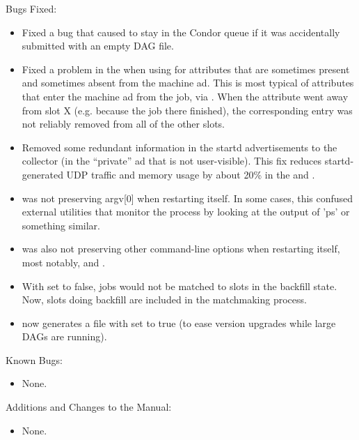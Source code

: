 \noindent Bugs Fixed:

\begin{itemize}

\item Fixed a bug that caused  to stay in the Condor
queue if it was accidentally submitted with an empty DAG file.

\item Fixed a problem in the  when using
 for attributes that are sometimes
present and sometimes absent from the machine ad.  This is most
typical of attributes that enter the machine ad from the job, via
.  When the attribute went away from slot
X (e.g. because the job there finished), the corresponding
 entry was not reliably removed from
all of the other slots.

\item Removed some redundant information in the startd advertisements
to the collector (in the ``private'' ad that is not user-visible).
This fix reduces startd-generated UDP traffic and memory usage by
about 20\% in the  and .

\item {} was not preserving argv[0] when restarting
itself.  In some cases, this confused external utilities that monitor
the  process by looking at the output of 'ps' or
something similar.

\item {} was also not preserving other command-line options
when restarting itself, most notably,  and .

\item With  set to false, jobs
would not be matched to slots in the backfill state.  Now, slots doing
backfill are included in the matchmaking process.

\item {} now generates a  file with
 set to true (to ease version upgrades while
large DAGs are running).

\end{itemize}

\noindent Known Bugs:

\begin{itemize}

\item None.

\end{itemize}

\noindent Additions and Changes to the Manual:

\begin{itemize}

\item None.

\end{itemize}

